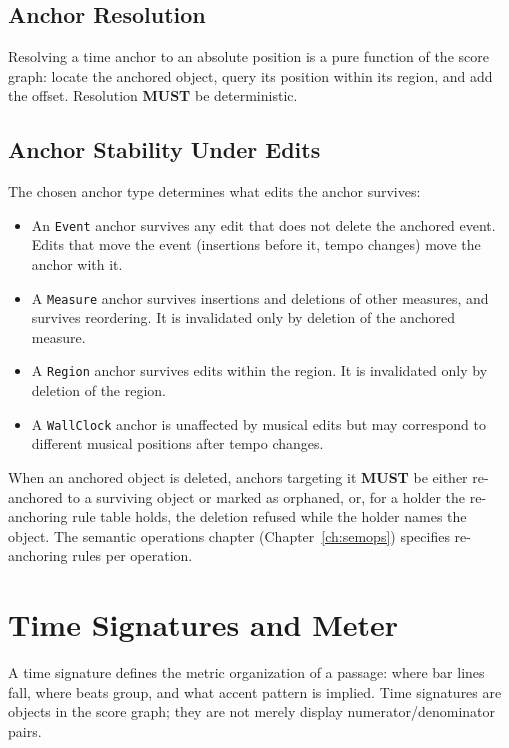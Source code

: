 \documentclass[11pt,letterpaper]{report}
\newcounter{requirement}[chapter]
\newcommand{\MUST}{\textbf{MUST}}
\begin{document}
\subsection{Anchor Resolution}

Resolving a time anchor to an absolute position is a pure function of
the score graph: locate the anchored object, query its position within
its region, and add the offset. Resolution \MUST{} be deterministic.

\subsection{Anchor Stability Under Edits}

The chosen anchor type determines what edits the anchor survives:

\begin{itemize}
  \item An \texttt{Event} anchor survives any edit that does not delete
    the anchored event. Edits that move the event (insertions before
    it, tempo changes) move the anchor with it.
  \item A \texttt{Measure} anchor survives insertions and deletions of
    other measures, and survives reordering. It is invalidated only by
    deletion of the anchored measure.
  \item A \texttt{Region} anchor survives edits within the region. It
    is invalidated only by deletion of the region.
  \item A \texttt{WallClock} anchor is unaffected by musical edits but
    may correspond to different musical positions after tempo changes.
\end{itemize}

\begin{requirement}
  \label{req:time:orphaned-anchor-handling}
  When an anchored object is deleted, anchors targeting it \MUST{} be
  either re-anchored to a surviving object or marked as orphaned, or, for
  a holder the re-anchoring rule table holds, the deletion refused while
  the holder names the object. The semantic operations chapter
  (Chapter~\ref{ch:semops}) specifies re-anchoring rules per operation.
\end{requirement}

\section{Time Signatures and Meter}
\label{sec:time:meter}

A time signature defines the metric organization of a passage: where
bar lines fall, where beats group, and what accent pattern is implied.
Time signatures are objects in the score graph; they are not merely
display numerator/denominator pairs.
\end{document}
